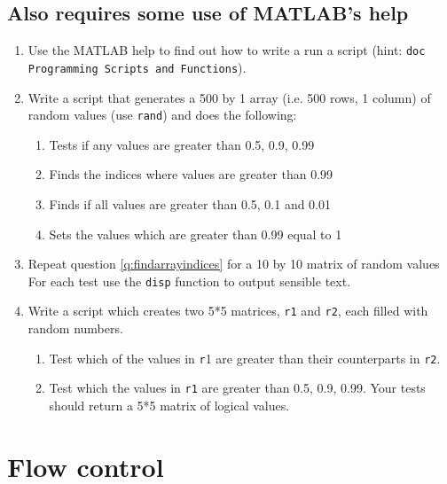 \documentclass{article}
\begin{document}
	\subsection*{Also requires some use of MATLAB's help}	
		\begin{enumerate}[resume]
		\item Use the MATLAB help to find out how to write a run a script (hint: \texttt{doc Programming Scripts and Functions}). 
		\item Write a script that generates a 500 by 1 array (i.e. 500 rows, 1 column) of random values (use \texttt{rand}) and does the following:
		\label{q:findarrayindices}
		\begin{enumerate}
			\item Tests if any values are greater than 0.5, 0.9, 0.99
			\item Finds the indices where values are greater than 0.99
			\item Finds if all values are greater than 0.5, 0.1 and 0.01
			\item Sets the values which are greater than 0.99 equal to 1
		\end{enumerate}
		\item Repeat question \ref{q:findarrayindices} for a 10 by 10 matrix of random values
		For each test use the \texttt{disp} function to output sensible text.
		\item Write a script which creates two 5*5 matrices, \texttt{r1} and \texttt{r2}, each filled with random numbers.
		\begin{enumerate}
			\item Test which of the values in \texttt{r}1 are greater than their counterparts in \texttt{r2}.
			\item Test which the values in \texttt{r1} are greater than 0.5, 0.9, 0.99. 
			Your tests should return a 5*5 matrix of logical values.
		\end{enumerate}
	\end{enumerate}
	
	\section{Flow control}
	\label{sec:flowcontrol}
\end{document}
